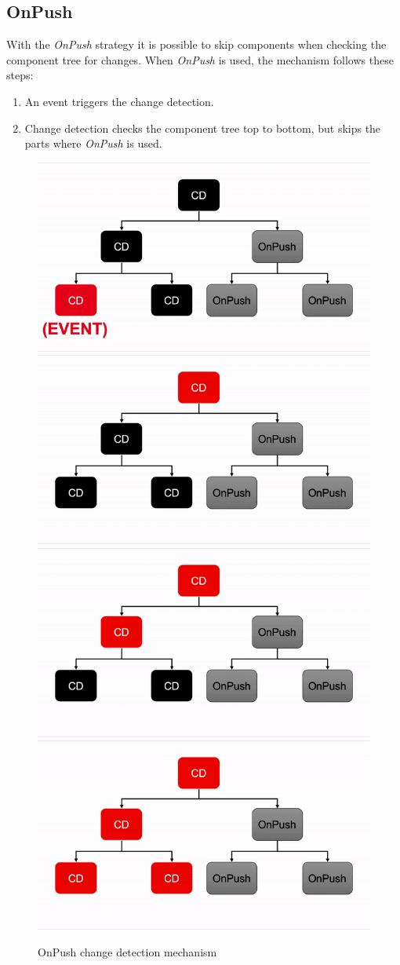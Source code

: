 \subsection{OnPush}
With the \emph{OnPush} strategy it is possible to skip components when checking the component tree for changes. When \emph{OnPush} is used, the mechanism follows these steps:
\begin{enumerate}
    \item An event triggers the change detection.
    \item Change detection checks the component tree top to bottom, but skips the parts where \emph{OnPush} is used.
    \autocite{Hoffmann2019}
\end{enumerate}

\begin{figure}[h!]
    \caption{OnPush change detection mechanism}
    \centering
    \includegraphics[width=.49\textwidth]{img/onpush-cycle1.png} 
    \includegraphics[width=.49\textwidth]{img/onpush-cycle2.png} 
    \includegraphics[width=.49\textwidth]{img/onpush-cycle3.png} 
    \includegraphics[width=.49\textwidth]{img/onpush-cycle4.png} 
\end{figure}

